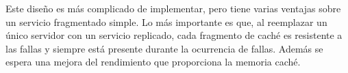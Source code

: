    Este diseño es más complicado de implementar, pero tiene varias ventajas sobre un servicio fragmentado simple. Lo más importante es que, al reemplazar un único servidor con un servicio replicado, cada fragmento de caché es resistente a las fallas y siempre está presente durante la ocurrencia de  fallas. Adem\'as se espera una mejora del rendimiento que proporciona la memoria caché. 
   
  
  
  

 